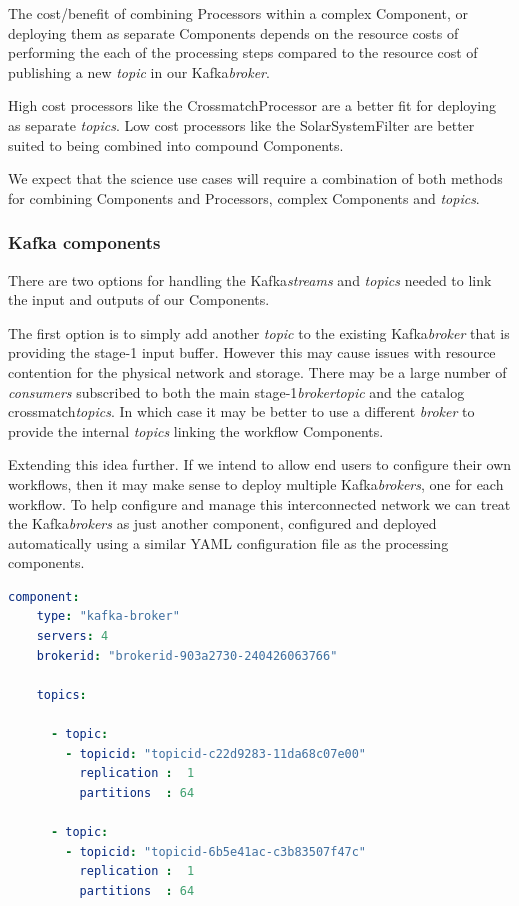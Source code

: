 \documentclass{article}
\newcommand{\yaml} {YAML\xspace}
\newcommand{\kafka} {Kafka\xspace}
\newcommand{\kftopic} {\textit{topic}\xspace}
\newcommand{\kftopics} {\textit{topics}\xspace}
\newcommand{\kfstreams} {\textit{streams}\xspace}
\newcommand{\kfbroker} {\textit{broker}\xspace}
\newcommand{\kfbrokers} {\textit{brokers}\xspace}
\newcommand{\kfconsumers} {\textit{consumers}\xspace}
\newcommand{\crossmatch} {crossmatch\xspace}
\newcommand{\stageone} {stage-1\xspace}
\newcommand{\javaname}[1] {{\ttfamily\color{codeblue} #1}}
\newcommand{\javaplural}[1] {\javaname{#1}s}
\begin{document}
The cost/benefit of combining \javaplural{Processor} within a complex \javaname{Component}, or deploying them as separate \javaplural{Component} depends on the resource costs of performing the each of the processing steps compared to the resource cost of publishing a new \kftopic in our \kafka \kfbroker.

High cost processors like the \javaname{CrossmatchProcessor} are a better fit for deploying as separate \kftopics. Low cost processors like the \javaname{SolarSystemFilter} are better suited to being combined into compound \javaname{Components}.

We expect that the science use cases will require a combination of both methods for combining \javaplural{Component} and \javaplural{Processor}, complex \javaplural{Component} and \kftopics.

\subsubsection{Kafka components}
\label{workflow.kafka-components}

There are two options for handling the \kafka \kfstreams and \kftopics needed to link the input and outputs of our \javaplural{Component}. 

The first option is to simply add another \kftopic to the existing \kafka \kfbroker that is providing the \stageone input buffer. However this may cause issues with resource contention for the physical network and storage.
There may be a large number of \kfconsumers subscribed to both the main \stageone \kfbroker \kftopic and the catalog \crossmatch \kftopics.
In which case it may be better to use a different \kfbroker to provide the internal \kftopics linking the workflow \javaplural{Component}.

Extending this idea further.
If we intend to allow end users to configure their own workflows, then it may make sense to deploy multiple \kafka \kfbrokers, one for each workflow.
To help configure and manage this interconnected network we can treat the \kafka \kfbrokers as just another component, configured and deployed automatically using a similar \yaml configuration file as the processing components.

\begin{lstlisting}[language=yaml]
  component:
    type: "kafka-broker"
    servers: 4 
    brokerid: "brokerid-903a2730-240426063766"

    topics:

      - topic:
        - topicid: "topicid-c22d9283-11da68c07e00"
          replication :  1
          partitions  : 64

      - topic:
        - topicid: "topicid-6b5e41ac-c3b83507f47c"
          replication :  1
          partitions  : 64
\end{lstlisting}
\end{document}
